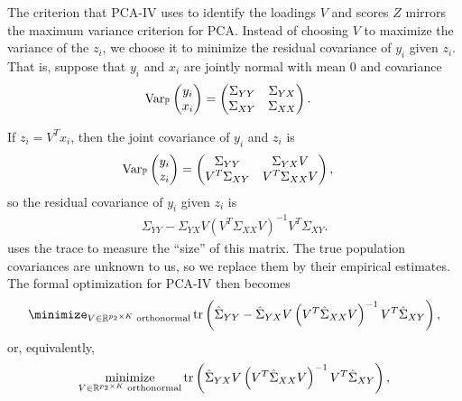 \documentclass[14pt]{extarticle}
\begin{document}
The criterion that PCA-IV uses to identify the loadings $V$ and scores $Z$
mirrors the maximum variance criterion for PCA. Instead of choosing $V$ to
maximize the variance of the $z_{i}$, we choose it to minimize the residual
covariance of $y_{i}$ given $z_{i}$. That is, suppose that $y_{i}$ and $x_{i}$
are jointly normal with mean 0 and covariance
\begin{align*}
\mathrm{Var}_{\mathbb{P}}\begin{pmatrix}y_{i} \\ x_{i}\end{pmatrix} &=
\begin{pmatrix}
  \Sigma_{YY} & \Sigma_{YX} \\
  \Sigma_{XY} & \Sigma_{XX}
\end{pmatrix}.
\end{align*}

If $z_{i} = V^{T}x_{i}$, then the joint covariance of $y_{i}$ and $z_{i}$ is
\begin{align*}
  \mathrm{Var}_{\mathbb{P}}\begin{pmatrix} y_{i} \\ z_{i} \end{pmatrix} &=
  \begin{pmatrix}
    \Sigma_{YY} & \Sigma_{YX}V \\
    V^{T}\Sigma_{XY} & V^{T}\Sigma_{XX}V
  \end{pmatrix},
\end{align*}
so the residual covariance of $y_i$ given $z_{i}$ is
\begin{align}
  \Sigma_{YY} -
  \Sigma_{YX}V\left(V^{T}\Sigma_{XX}V\right)^{-1}V^{T}\Sigma_{XY}. \label{eq:pca_iv_resid_cov}
\end{align}
\citep{rao1964use} uses the trace to measure the ``size'' of this matrix. The
true population covariances are unknown to us, so we replace them by their
empirical estimates. The formal optimization for PCA-IV then becomes
\begin{align}
  \minimize_{V\in \reals^{p_{2} \times K} \text{ orthonormal}}
  \tr\left(\hat{\Sigma}_{YY} -
  \hat{\Sigma}_{YX}V\left(V^{T}\hat{\Sigma}_{XX}V\right)^{-1}V^{T}\hat{\Sigma}_{XY}\right) \label{eq:pca_iv_obj},
\end{align}
or, equivalently,
\begin{align}
  \mathop\mathrm{minimize}_{V\in \mathbb{R}^{p_{2} \times K} \text{ orthonormal}}
  \mathop\mathrm{tr}\left(\hat{\Sigma}_{YX}V\left(V^{T}\hat{\Sigma}_{XX}V\right)^{-1}V^{T}\hat{\Sigma}_{XY}\right) \label{eq:pca_iv_obj_2},
\end{align}
\end{document}
